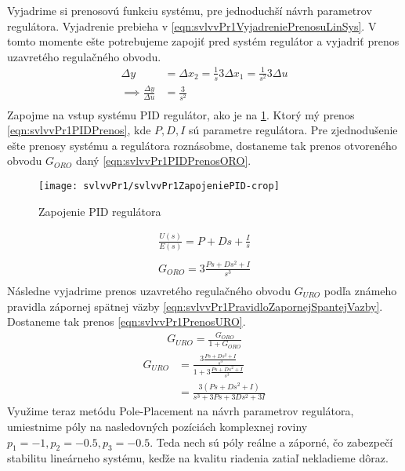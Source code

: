 \documentclass[../main.tex]{subfiles}
\begin{document}
	Vyjadrime si prenosovú funkciu systému, pre jednoduchší návrh parametrov regulátora. Vyjadrenie prebieha v \cref{eqn:svlvvPr1VyjadreniePrenosuLinSys}. V tomto momente ešte potrebujeme zapojiť pred systém regulátor a vyjadriť prenos uzavretého regulačného obvodu.
	\begin{equation}
	\begin{aligned}
		\Delta  y &= \Delta x_2 = \frac{1}{s}  3 \Delta x_1 = \frac{1}{s^2}  3 \Delta u \\
		\implies \frac{\Delta y}{\Delta u } &= \frac{3}{s^2} \\
	\end{aligned}
	\label{eqn:svlvvPr1VyjadreniePrenosuLinSys}
	\end{equation}
	Zapojme na vstup systému PID regulátor, ako je na \cref{fig:svlvvPr1ZapojeinePIDNaLinSys}. Ktorý mý prenos \cref{eqn:svlvvPr1PIDPrenos}, kde $P, D, I$ sú parametre regulátora. Pre zjednodušenie ešte prenosy systému a regulátora roznásobme, dostaneme tak prenos otvoreného obvodu $G_{ORO}$ daný \cref{eqn:svlvvPr1PIDPrenosORO}. 
	\begin{figure}[h!]
		\centering
		\texttt{[image: svlvvPr1/svlvvPr1ZapojeniePID-crop]}
		\caption{Zapojenie PID regulátora}
		\label{fig:svlvvPr1ZapojeinePIDNaLinSys}
	\end{figure}
	\begin{equation}
		\begin{aligned}
			\frac{U(s)}{E(s)} = P + Ds + \frac{I}{s} \\
		\end{aligned}
		\label{eqn:svlvvPr1PIDPrenos}
	\end{equation}
	\begin{equation}
	\begin{aligned}
	G_{ORO} = 3\frac{Ps + Ds^2 + I}{s^3} \\
	\end{aligned}
	\label{eqn:svlvvPr1PIDPrenosORO}
	\end{equation}
	Následne vyjadrime prenos uzavretého regulačného obvodu $G_{URO}$ podľa známeho pravidla zápornej spätnej väzby \cref{eqn:svlvvPr1PravidloZapornejSpantejVazby}. Dostaneme tak prenos \cref{eqn:svlvvPr1PrenosURO}.
	\begin{equation}
			\begin{aligned}
			G_{URO} = \frac{G_{ORO}}{1 + G_{ORO}}
			\end{aligned}
			\label{eqn:svlvvPr1PravidloZapornejSpantejVazby}
	\end{equation}
	\begin{equation}
		\begin{aligned}
		G_{URO} &= \frac{3\frac{Ps + Ds^2 + I}{s^3}}{1 + 3\frac{Ps + Ds^2 + I}{s^3}}  \\
		 		&= \frac{3(Ps + Ds^2 + I)}{s^3 + 3Ps + 3Ds^2 + 3I}
		\end{aligned}
		\label{eqn:svlvvPr1PrenosURO}
	\end{equation}
	Využime teraz metódu Pole-Placement na návrh parametrov regulátora, umiestnime póly na nasledovných pozíciách komplexnej roviny $p_1 = -1, p_2 = -0.5, p_3 = -0.5$. Teda nech sú póly reálne a záporné, čo zabezpečí stabilitu lineárneho systému, keďže na kvalitu riadenia zatiaľ nekladieme dôraz.
\end{document}
